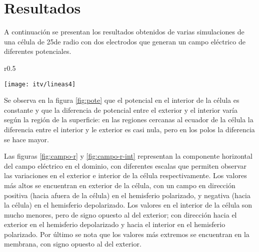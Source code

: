 
\newpage

\section{Resultados}
A continuación se presentan los resultados obtenidos de varias simulaciones de una célula de 25\um de radio con dos electrodos que generan un campo eléctrico de diferentes potenciales.



\begin{wrapfigure}{r}{0.5\textwidth}
  \begin{center}
    \texttt{[image: itv/lineas4]}
  \end{center}
  \caption{Potencial eléctrico en el dominio para\\ E = 1600 \si{\volt\per\centi\metre}}
  \label{fig:pote}
\end{wrapfigure}

Se observa en la figura \ref{fig:pote} que el potencial en el interior de la célula es constante y que la diferencia de potencial entre el exterior y el interior varía según la región de la superficie: en las regiones cercanas al ecuador de la célula la diferencia entre el interior y le exterior es casi nula, pero en los polos la diferencia se hace mayor. 

Las figuras \ref{fig:campo-r} y \ref{fig:campo-r-int} representan la componente horizontal del campo eléctrico en el dominio, con diferentes escalas que permiten observar las variaciones en el exterior e interior de la célula respectivamente. Los valores más altos se encuentran en exterior de la célula, con un campo en dirección positiva (hacia afuera de la célula) en el hemisferio polarizado, y negativa (hacia la célula) en el hemisferio depolarizado. Los valores en el interior de la célula son mucho menores, pero de signo opuesto al del exterior; con dirección hacia el exterior en el hemisferio depolarizado y hacia el interior en el hemisferio polarizado. Por último se nota que los valores más extremos se encuentran en la membrana, con signo opuesto al del exterior. 

